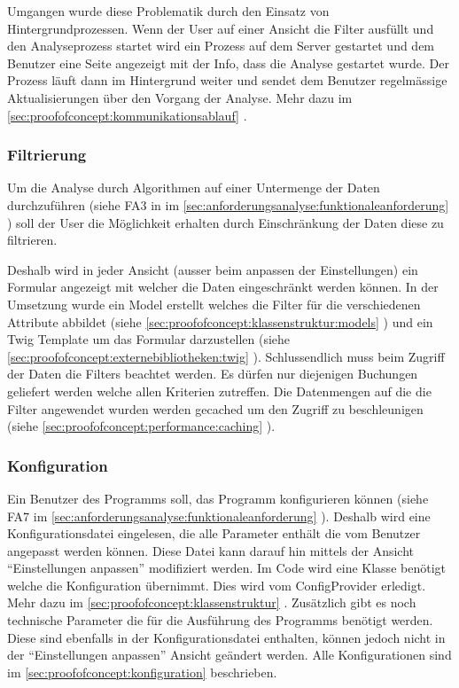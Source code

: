 Umgangen wurde diese Problematik durch den Einsatz von Hintergrundprozessen. Wenn der User auf einer Ansicht die Filter ausfüllt und den Analyseprozess startet wird ein Prozess auf dem Server gestartet und dem Benutzer eine Seite angezeigt mit der Info, dass die Analyse gestartet wurde. Der Prozess läuft dann im Hintergrund weiter und sendet dem Benutzer regelmässige Aktualisierungen über den Vorgang der Analyse. Mehr dazu im \cref{sec:proofofconcept:kommunikationsablauf} .

\subsubsection{Filtrierung}
\label{sec:proofofconcept:architektur:anforderungen:filtrierung}
Um die Analyse durch Algorithmen auf einer Untermenge der Daten durchzuführen (siehe FA3 in im \cref{sec:anforderungsanalyse:funktionaleanforderung} ) soll der User die Möglichkeit erhalten durch Einschränkung der Daten diese zu filtrieren. 

Deshalb wird in jeder Ansicht (ausser beim anpassen der Einstellungen) ein Formular angezeigt mit welcher die Daten eingeschränkt werden können. In der Umsetzung wurde ein Model erstellt welches die Filter für die verschiedenen Attribute abbildet (siehe \cref{sec:proofofconcept:klassenstruktur:models} ) und ein Twig Template um das Formular darzustellen (siehe \cref{sec:proofofconcept:externebibliotheken:twig} ). Schlussendlich muss beim Zugriff der Daten die Filters beachtet werden. Es dürfen nur diejenigen Buchungen geliefert werden welche allen Kriterien zutreffen. Die Datenmengen auf die die Filter angewendet wurden werden gecached um den Zugriff zu beschleunigen (siehe \cref{sec:proofofconcept:performance:caching} ).

\subsubsection{Konfiguration}
Ein Benutzer des Programms soll, das Programm konfigurieren können (siehe FA7 im \cref{sec:anforderungsanalyse:funktionaleanforderung} ). Deshalb wird eine Konfigurationsdatei eingelesen, die alle Parameter enthält die vom Benutzer angepasst werden können. Diese Datei kann darauf hin mittels der Ansicht "`Einstellungen anpassen"' modifiziert werden. Im Code wird eine Klasse benötigt welche die Konfiguration übernimmt. Dies wird vom ConfigProvider erledigt. Mehr dazu im \cref{sec:proofofconcept:klassenstruktur} . Zusätzlich gibt es noch technische Parameter die für die Ausführung des Programms benötigt werden. Diese sind ebenfalls in der Konfigurationsdatei enthalten, können jedoch nicht in der "`Einstellungen anpassen"' Ansicht geändert werden. Alle Konfigurationen sind im \cref{sec:proofofconcept:konfiguration}  beschrieben.




